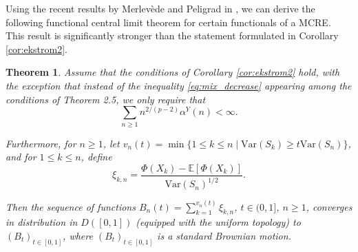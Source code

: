 \documentclass[a4paper,10pt]{article}
\newtheorem{theorem}{Theorem}[section]
\newcommand{\E}{\mathbb{E}}
\newcommand{\var}{\mathrm{Var}}
\begin{document}
Using the recent results by Merlev\`ede and Peligrad in \cite{merlevede2020functional}, we can derive the following functional central limit theorem 
for certain functionals of a MCRE.
This result is significantly stronger than the statement formulated in Corollary \ref{cor:ekstrom2}. 
\begin{theorem}\label{thm:MCRE_FCLT}	
	Assume that the conditions of Corollary \ref{cor:ekstrom2} hold, with the exception that instead of the inequality \eqref{eq:mix_decrease} appearing among the conditions of Theorem 2.5, we only require that
	$$
	\sum_{n\ge 1} n^{2/(p-2)}\alpha^Y(n) < \infty.
	$$
	
	Furthermore, for $n \ge 1$, let $v_n(t) = \min \{1 \le k \le n \mid \var(S_k) \ge t\var(S_n)\}$, and for $1 \le k \le n$, define
	$$
	\xi_{k,n} = \frac{\Phi(X_k) - \E[\Phi(X_k)]}{\var(S_n)^{1/2}}.
	$$
	
	Then the sequence of functions $B_n(t) = \sum_{k=1}^{v_n(t)} \xi_{k,n}$, $t \in (0, 1]$, $n \ge 1$, converges in distribution in $D([0, 1])$ (equipped with the uniform topology) to $(B_t)_{t\in [0,1]}$, where $(B_t)_{t\in [0,1]}$ is a standard Brownian motion.
\end{theorem}
\end{document}
